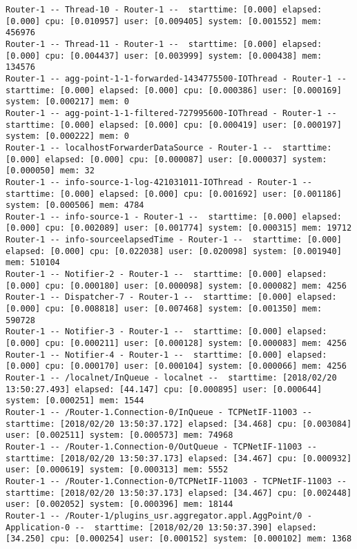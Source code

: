 \begin{lstlisting}[language=config]
Router-1 -- Thread-10 - Router-1 --  starttime: [0.000] elapsed: [0.000] cpu: [0.010957] user: [0.009405] system: [0.001552] mem: 456976
Router-1 -- Thread-11 - Router-1 --  starttime: [0.000] elapsed: [0.000] cpu: [0.004437] user: [0.003999] system: [0.000438] mem: 134576
Router-1 -- agg-point-1-1-forwarded-1434775500-IOThread - Router-1 --  starttime: [0.000] elapsed: [0.000] cpu: [0.000386] user: [0.000169] system: [0.000217] mem: 0
Router-1 -- agg-point-1-1-filtered-727995600-IOThread - Router-1 --  starttime: [0.000] elapsed: [0.000] cpu: [0.000419] user: [0.000197] system: [0.000222] mem: 0
Router-1 -- localhostForwarderDataSource - Router-1 --  starttime: [0.000] elapsed: [0.000] cpu: [0.000087] user: [0.000037] system: [0.000050] mem: 32
Router-1 -- info-source-1-log-421031011-IOThread - Router-1 --  starttime: [0.000] elapsed: [0.000] cpu: [0.001692] user: [0.001186] system: [0.000506] mem: 4784
Router-1 -- info-source-1 - Router-1 --  starttime: [0.000] elapsed: [0.000] cpu: [0.002089] user: [0.001774] system: [0.000315] mem: 19712
Router-1 -- info-sourceelapsedTime - Router-1 --  starttime: [0.000] elapsed: [0.000] cpu: [0.022038] user: [0.020098] system: [0.001940] mem: 510104
Router-1 -- Notifier-2 - Router-1 --  starttime: [0.000] elapsed: [0.000] cpu: [0.000180] user: [0.000098] system: [0.000082] mem: 4256
Router-1 -- Dispatcher-7 - Router-1 --  starttime: [0.000] elapsed: [0.000] cpu: [0.008818] user: [0.007468] system: [0.001350] mem: 590728
Router-1 -- Notifier-3 - Router-1 --  starttime: [0.000] elapsed: [0.000] cpu: [0.000211] user: [0.000128] system: [0.000083] mem: 4256
Router-1 -- Notifier-4 - Router-1 --  starttime: [0.000] elapsed: [0.000] cpu: [0.000170] user: [0.000104] system: [0.000066] mem: 4256
Router-1 -- /localnet/InQueue - localnet --  starttime: [2018/02/20 13:50:27.493] elapsed: [44.147] cpu: [0.000895] user: [0.000644] system: [0.000251] mem: 1544
Router-1 -- /Router-1.Connection-0/InQueue - TCPNetIF-11003 --  starttime: [2018/02/20 13:50:37.172] elapsed: [34.468] cpu: [0.003084] user: [0.002511] system: [0.000573] mem: 74968
Router-1 -- /Router-1.Connection-0/OutQueue - TCPNetIF-11003 --  starttime: [2018/02/20 13:50:37.173] elapsed: [34.467] cpu: [0.000932] user: [0.000619] system: [0.000313] mem: 5552
Router-1 -- /Router-1.Connection-0/TCPNetIF-11003 - TCPNetIF-11003 --  starttime: [2018/02/20 13:50:37.173] elapsed: [34.467] cpu: [0.002448] user: [0.002052] system: [0.000396] mem: 18144
Router-1 -- /Router-1/plugins_usr.aggregator.appl.AggPoint/0 - Application-0 --  starttime: [2018/02/20 13:50:37.390] elapsed: [34.250] cpu: [0.000254] user: [0.000152] system: [0.000102] mem: 1368

\end{lstlisting}
